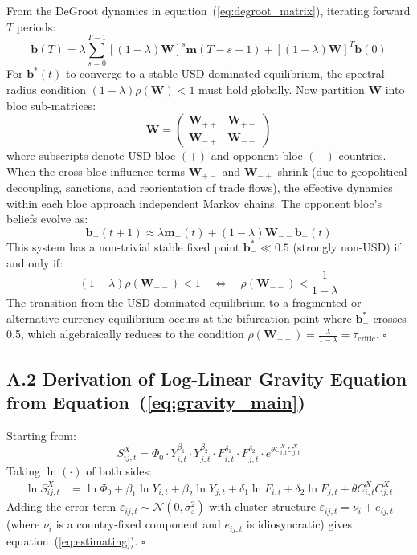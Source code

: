 \documentclass[12pt, letterpaper]{article}
\theoremstyle{definition}
\begin{document}
From the DeGroot dynamics in equation~(\ref{eq:degroot_matrix}), iterating forward $T$ periods:
\[
\mathbf{b}(T) = \lambda \sum_{s=0}^{T-1} \left[(1-\lambda)\mathbf{W}\right]^s \mathbf{m}(T-s-1) + \left[(1-\lambda)\mathbf{W}\right]^T \mathbf{b}(0)
\]
For $\mathbf{b}^*(t)$ to converge to a stable USD-dominated equilibrium, the spectral radius condition $(1-\lambda)\rho(\mathbf{W}) < 1$ must hold globally. Now partition $\mathbf{W}$ into bloc sub-matrices:
\[
\mathbf{W} = \begin{pmatrix} \mathbf{W}_{++} & \mathbf{W}_{+-} \\ \mathbf{W}_{-+} & \mathbf{W}_{--} \end{pmatrix}
\]
where subscripts denote USD-bloc $(+)$ and opponent-bloc $(-)$ countries. When the cross-bloc influence terms $\mathbf{W}_{+-}$ and $\mathbf{W}_{-+}$ shrink (due to geopolitical decoupling, sanctions, and reorientation of trade flows), the effective dynamics within each bloc approach independent Markov chains. The opponent bloc's beliefs evolve as:
\[
\mathbf{b}_{-}(t+1) \approx \lambda \mathbf{m}_{-}(t) + (1-\lambda)\mathbf{W}_{--}\mathbf{b}_{-}(t)
\]
This system has a non-trivial stable fixed point $\mathbf{b}_{-}^* \ll 0.5$ (strongly non-USD) if and only if:
\[
(1-\lambda)\rho(\mathbf{W}_{--}) < 1 \quad \Longleftrightarrow \quad \rho(\mathbf{W}_{--}) < \frac{1}{1-\lambda}
\]
The transition from the USD-dominated equilibrium to a fragmented or alternative-currency equilibrium occurs at the bifurcation point where $\mathbf{b}_{-}^*$ crosses 0.5, which algebraically reduces to the condition $\rho(\mathbf{W}_{--}) = \frac{\lambda}{1-\lambda} = \tau_{\text{critic}}$. $\square$

\subsection*{A.2 Derivation of Log-Linear Gravity Equation from Equation~(\ref{eq:gravity_main})}

Starting from:
\[
S_{ij,t}^X = \Phi_0 \cdot Y_{i,t}^{\beta_1} \cdot Y_{j,t}^{\beta_2} \cdot F_{i,t}^{\delta_1} \cdot F_{j,t}^{\delta_2} \cdot e^{\theta C_{i,t}^X C_{j,t}^X}
\]
Taking $\ln(\cdot)$ of both sides:
\begin{align*}
\ln S_{ij,t}^X &= \ln \Phi_0 + \beta_1 \ln Y_{i,t} + \beta_2 \ln Y_{j,t} + \delta_1 \ln F_{i,t} + \delta_2 \ln F_{j,t} + \theta C_{i,t}^X C_{j,t}^X
\end{align*}
Adding the error term $\varepsilon_{ij,t} \sim \mathcal{N}(0, \sigma^2_\varepsilon)$ with cluster structure $\varepsilon_{ij,t} = \nu_i + e_{ij,t}$ (where $\nu_i$ is a country-fixed component and $e_{ij,t}$ is idiosyncratic) gives equation~(\ref{eq:estimating}). $\square$
\end{document}
